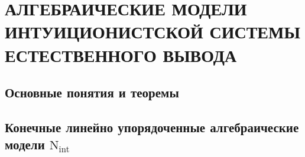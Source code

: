 \section{\uppercase{Алгебраические модели интуиционистской системы естественного вывода}}

\subsection{Основные понятия и теоремы}

\newpage

\subsection{Конечные линейно упорядоченные алгебраические модели $\text{N}_\text{int}$}
